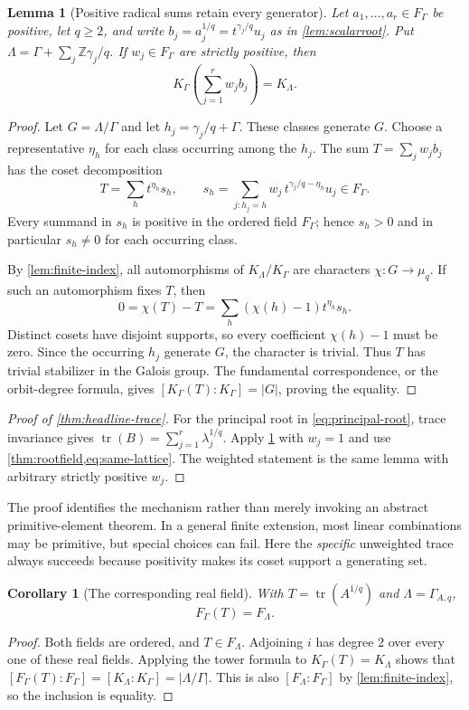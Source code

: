 \documentclass[11pt,letterpaper]{article}
\numberwithin{equation}{section}
\newtheorem{lemma}[theorem]{Lemma}
\newtheorem{corollary}[theorem]{Corollary}
\theoremstyle{definition}
\theoremstyle{remark}
\newcommand{\Z}{\mathbb Z}
\newcommand{\tr}{\operatorname{tr}}
\newcommand{\FG}{F_{\Gamma}}
\begin{document}
\begin{lemma}[Positive radical sums retain every generator]\label{lem:positive-trace}
Let $a_1,\ldots,a_r\in\FG$ be positive, let $q\ge2$, and write
$b_j=a_j^{1/q}=t^{\gamma_j/q}u_j$ as in \cref{lem:scalarroot}. Put
$\Lambda=\Gamma+\sum_j\Z\gamma_j/q$. If $w_j\in\FG$ are strictly positive,
then
\begin{equation}\label{eq:positive-sum}
 K_\Gamma\left(\sum_{j=1}^r w_jb_j\right)=K_\Lambda.
\end{equation}
\end{lemma}
\begin{proof}
Let $G=\Lambda/\Gamma$ and let $h_j=\gamma_j/q+\Gamma$. These classes
generate $G$. Choose a representative $\eta_h$ for each class occurring
among the $h_j$. The sum $T=\sum_jw_jb_j$ has the coset decomposition
\[
 T=\sum_h t^{\eta_h}s_h,\qquad
 s_h=\sum_{j:h_j=h}w_j\,t^{\gamma_j/q-\eta_h}u_j\in\FG.
\]
Every summand in $s_h$ is positive in the ordered field $\FG$; hence
$s_h>0$ and in particular $s_h\ne0$ for each occurring class.

By \cref{lem:finite-index}, all automorphisms of $K_\Lambda/K_\Gamma$ are
characters $\chi:G\to\mu_q$. If such an automorphism fixes $T$, then
\[
 0=\chi(T)-T=\sum_h(\chi(h)-1)t^{\eta_h}s_h.
\]
Distinct cosets have disjoint supports, so every coefficient $\chi(h)-1$
must be zero. Since the occurring $h_j$ generate $G$, the character is
trivial. Thus $T$ has trivial stabilizer in the Galois group. The fundamental
correspondence, or the orbit-degree formula, gives
$[K_\Gamma(T):K_\Gamma]=|G|$, proving the equality.
\end{proof}

\begin{proof}[Proof of \cref{thm:headline-trace}]
For the principal root in \cref{eq:principal-root}, trace invariance gives
$\tr(B)=\sum_{j=1}^r\lambda_j^{1/q}$. Apply
\cref{lem:positive-trace} with $w_j=1$ and use
\cref{thm:rootfield,eq:same-lattice}. The weighted statement is the same
lemma with arbitrary strictly positive $w_j$.
\end{proof}

The proof identifies the mechanism rather than merely invoking an abstract
primitive-element theorem. In a general finite extension, most linear
combinations may be primitive, but special choices can fail. Here the
\emph{specific} unweighted trace always succeeds because positivity makes
its coset support a generating set.

\begin{corollary}[The corresponding real field]\label{cor:realtrace}
With $T=\tr(A^{1/q})$ and $\Lambda=\Gamma_{A,q}$,
\[
 F_\Gamma(T)=F_\Lambda.
\]
\end{corollary}
\begin{proof}
Both fields are ordered, and $T\in F_\Lambda$. Adjoining $i$ has degree $2$
over every one of these real fields. Applying the tower formula to
$K_\Gamma(T)=K_\Lambda$ shows that
$[F_\Gamma(T):F_\Gamma]=[K_\Lambda:K_\Gamma]=|\Lambda/\Gamma|$.
This is also $[F_\Lambda:F_\Gamma]$ by \cref{lem:finite-index}, so the
inclusion is equality.
\end{proof}
\end{document}
